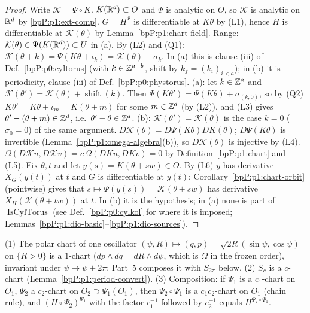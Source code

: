 \begin{proof}
Write $\mathcal K=\Psi\circ K$.
\label{stepP:p1:tt-an} $K(\mathbb{R}^d)\subset O$ and $\Psi$ is analytic on $O$, so $\mathcal K$ is analytic on $\mathbb{R}^d$ by \ref{bpP:p1:ext-comp}. $G=H^\Psi$ is differentiable at $K\theta$ by (L1), hence $H$ is differentiable at $\mathcal K(\theta)$ by Lemma~\ref{bpP:p1:chart-field}. Range: $\mathcal K(\theta)\in\Psi(K(\mathbb{R}^d))\subset U$ in (a).
\label{stepP:p1:tt-lat} By (L2) and (Q1): $\mathcal K(\theta+k)=\Psi(K\theta+\iota_k)=\mathcal K(\theta)+\sigma_k$. In (a) this is clause (iii) of Def.~\ref{bpP:p0:cyltorus} (with $k\in\mathbb{Z}^{a+b}$, shift by $k_f=(k_i)_{i<a}$); in (b) it is periodicity, clause (iii) of Def.~\ref{bpP:p0:phystorus}.
\label{stepP:p1:tt-inj} (a): let $k\in\mathbb{Z}^a$ and $\mathcal K(\theta')=\mathcal K(\theta)+\operatorname{shift}(k)$. Then $\Psi(K\theta')=\Psi(K\theta)+\sigma_{(k,0)}$, so by (Q2) $K\theta'=K\theta+\iota_m=K(\theta+m)$ for some $m\in\mathbb{Z}^d$ (by (L2)), and (L3) gives $\theta'-(\theta+m)\in\mathbb{Z}^d$, i.e.\ $\theta'-\theta\in\mathbb{Z}^d$. (b): $\mathcal K(\theta')=\mathcal K(\theta)$ is the case $k=0$ ($\sigma_0=0$) of the same argument.
\label{stepP:p1:tt-lag} $D\mathcal K(\theta)=D\Psi(K\theta)DK(\theta)$; $D\Psi(K\theta)$ is invertible (Lemma~\ref{bpP:p1:omega-algebra}(b)), so $D\mathcal K(\theta)$ is injective by (L4). $\Omega(D\mathcal K u,D\mathcal Kv)=c\,\Omega(DKu,DKv)=0$ by Definition~\ref{bpP:p1:chart} and (L5).
\label{stepP:p1:tt-flow} Fix $\theta,t$ and let $y(s)=K(\theta+sw)\in O$. By (L6) $y$ has derivative $X_G(y(t))$ at $t$ and $G$ is differentiable at $y(t)$; Corollary~\ref{bpP:p1:chart-orbit} (pointwise) gives that $s\mapsto\Psi(y(s))=\mathcal K(\theta+sw)$ has derivative $X_H(\mathcal K(\theta+tw))$ at $t$.
\label{stepP:p1:tt-dio} In (b) it is the hypothesis; in (a) none is part of $\operatorname{IsCylTorus}$ (see Def.~\ref{bpP:p0:cylkol} for where it is imposed; Lemmas~\ref{bpP:p1:dio-basic}--\ref{bpP:p1:dio-sources}).
\end{proof}

\begin{remark}\label{bpP:p1:typical}
(1) The polar chart of one oscillator $(\psi,R)\mapsto(q,p)=\sqrt{2R}(\sin\psi,\cos\psi)$ on $\{R>0\}$ is a $1$-chart ($dp\wedge dq=dR\wedge d\psi$, which is $\Omega$ in the frozen order), invariant under $\psi\mapsto\psi+2\pi$; Part~5 composes it with $S_{2\pi}$ below. (2) $S_c$ is a $c$-chart (Lemma~\ref{bpP:p1:period-convert}). (3) Composition: if $\Psi_1$ is a $c_1$-chart on $O_1$, $\Psi_2$ a $c_2$-chart on $O_2\supset\Psi_1(O_1)$, then $\Psi_2\circ\Psi_1$ is a $c_1c_2$-chart on $O_1$ (chain rule), and $(H\circ\Psi_2)^{\Psi_1}$ with the factor $c_1^{-1}$ followed by $c_2^{-1}$ equals $H^{\Psi_2\circ\Psi_1}$.
\end{remark}

